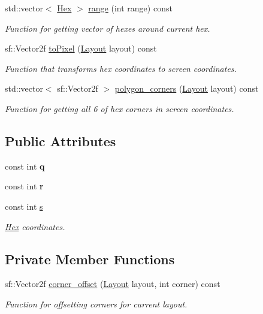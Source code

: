 \begin{DoxyCompactItemize}
std\+::vector$<$ \hyperlink{classHex}{Hex} $>$ \hyperlink{classHex_afb255b08e97fec5707089d529b65ae32}{range} (int range) const 
\begin{DoxyCompactList}\small\item\em Function for getting vector of hexes around current hex. \end{DoxyCompactList}\item 
sf\+::\+Vector2f \hyperlink{classHex_a9c4d119e6cc11eeacbf554811ccb19ee}{to\+Pixel} (\hyperlink{structLayout}{Layout} layout) const 
\begin{DoxyCompactList}\small\item\em Function that transforms hex coordinates to screen coordinates. \end{DoxyCompactList}\item 
std\+::vector$<$ sf\+::\+Vector2f $>$ \hyperlink{classHex_a56ee9508825a945bac8ea29802e578f4}{polygon\+\_\+corners} (\hyperlink{structLayout}{Layout} layout) const 
\begin{DoxyCompactList}\small\item\em Function for getting all 6 of hex corners in screen coordinates. \end{DoxyCompactList}\end{DoxyCompactItemize}
\subsection*{Public Attributes}
\begin{DoxyCompactItemize}
\item 
const int {\bfseries q}\hypertarget{classHex_ab1b70169be08ac771114d47dffe648de}{}\label{classHex_ab1b70169be08ac771114d47dffe648de}

\item 
const int {\bfseries r}\hypertarget{classHex_ad99466545613f1634c0819567d551353}{}\label{classHex_ad99466545613f1634c0819567d551353}

\item 
const int \hyperlink{classHex_af52636425c8cdb5cad6468985b75b699}{s}\hypertarget{classHex_af52636425c8cdb5cad6468985b75b699}{}\label{classHex_af52636425c8cdb5cad6468985b75b699}

\begin{DoxyCompactList}\small\item\em \hyperlink{classHex}{Hex} coordinates. \end{DoxyCompactList}\end{DoxyCompactItemize}
\subsection*{Private Member Functions}
\begin{DoxyCompactItemize}
\item 
sf\+::\+Vector2f \hyperlink{classHex_afc9f0c2346c9da25c6350274f74eba47}{corner\+\_\+offset} (\hyperlink{structLayout}{Layout} layout, int corner) const 
\begin{DoxyCompactList}\small\item\em Function for offsetting corners for current layout. \end{DoxyCompactList}\end{DoxyCompactItemize}


